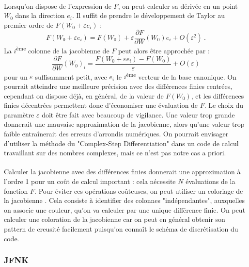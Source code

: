       \paragraph{}
      Lorsqu'on dispose de l'expression de $F$, on peut calculer sa dérivée en un point $W_0$ dans la direction $e_i$.
      Il suffit de prendre le développement de Taylor au premier ordre de $F\left(W_0 + \varepsilon e_i\right)$ :
      \[F\left(W_0 + \varepsilon e_i\right) = F\left(W_0\right) + \varepsilon\frac{\partial F}{\partial W}\left(W_0\right)e_i + O\left(\varepsilon^2\right)\ .\]
      La $i$\textsuperscript{ème} colonne de la jacobienne de $F$ peut alors être approchée par :
      \[\frac{\partial F}{\partial W}\left(W_0\right)_i = \frac{F\left(W_0 + \varepsilon e_i\right) - F\left(W_0\right)}{\varepsilon} + O\left(\varepsilon\right)\]
      pour un $\varepsilon$ suffisamment petit, avec $e_i$ le $i$\textsuperscript{ème} vecteur de la base canonique.
      On pourrait atteindre une meilleure précision avec des différences finies centrées, cependant on dispose déjà, en général, de la valeur de $F\left(W_0\right)$, et les différences finies décentrées permettent donc d'économiser une évaluation de $F$.
      Le choix du paramètre $\varepsilon$ doit être fait avec beaucoup de vigilance.
      Une valeur trop grande donnerait une mauvaise approximation de la jacobienne, alors qu'une valeur trop faible entraînerait des erreurs d'arrondis numériques.
      On pourrait envisager d'utiliser la méthode du "Complex-Step Differentiation" dans un code de calcul travaillant sur des nombres complexes, mais ce n'est pas notre cas a priori.

      \paragraph{}
      Calculer la jacobienne avec des différences finies donnerait une approximation à l'ordre 1 pour un coût de calcul important : cela nécessite $N$ évaluations de la fonction $F$.
      Pour éviter ces opérations coûteuses, on peut utiliser un coloriage de la jacobienne \cite{GebremedhinMannePothen2005}.
      Cela consiste à identifier des colonnes "indépendantes", auxquelles on associe une couleur, qu'on va calculer par une unique différence finie.
      On peut calculer une coloration de la jacobienne car on peut en général obtenir son pattern de creusité facilement puisqu'on connaît le schéma de discrétisation du code.

    \subsubsection{JFNK}

